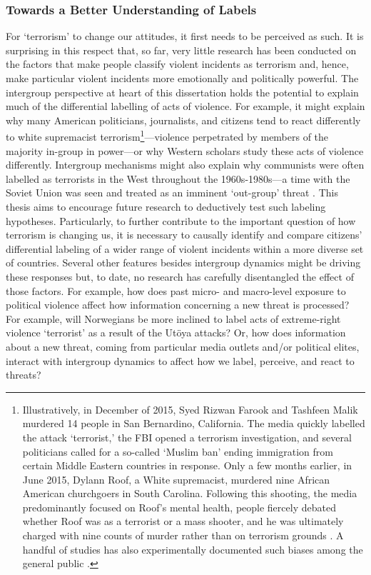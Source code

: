 \subsubsection{Towards a Better Understanding of Labels}
For `terrorism' to change our attitudes, it first needs to be perceived as such. It is surprising in this respect that, so far, very little research has been conducted on the factors that make people classify violent incidents as terrorism \citep[but for an important exception, see][]{Huff2018} and, hence, make particular violent incidents more emotionally and politically powerful. The intergroup perspective at heart of this dissertation holds the potential to explain much of the differential labelling of acts of violence. For example, it might explain why many American politicians, journalists, and citizens tend to react differently to white supremacist terrorism\footnote{Illustratively, in December of 2015, Syed Rizwan Farook and Tashfeen Malik murdered 14 people in San Bernardino, California. The media quickly labelled the attack ‘terrorist,’ the FBI opened a terrorism investigation, and several politicians called for a so-called ‘Muslim ban’ ending immigration from certain Middle Eastern countries in response. Only a few months earlier, in June 2015, Dylann Roof, a White supremacist, murdered nine African American churchgoers in South Carolina. Following this shooting, the media predominantly focused on Roof’s mental health, people fiercely debated whether Roof was as a terrorist or a mass shooter, and he was ultimately charged with nine counts of murder rather than on terrorism grounds \citep{Butler2015}. A handful of studies has also experimentally documented such biases among the general public \citep[e.g.,][]{Piazza2015}.}---violence perpetrated by members of the majority in-group in power---or why Western scholars study these acts of violence differently. Intergroup mechanisms might also explain why communists were often labelled as terrorists in the West throughout the 1960s-1980s---a time with the Soviet Union was seen and treated as an imminent `out-group' threat \citep{Stampnitzky2013}. This thesis aims to encourage future research to deductively test such labeling hypotheses. Particularly, to further contribute to the important question of how terrorism is changing us, it is necessary to causally identify and compare citizens’ differential labeling of a wider range of violent incidents within a more diverse set of countries. Several other features besides intergroup dynamics might be driving these responses but, to date, no research has carefully disentangled the effect of those factors. For example, how does past micro- and macro-level exposure to political violence affect how information concerning a new threat is processed? For example, will Norwegians be more inclined to label acts of extreme-right violence `terrorist' as a result of the Ut{\"{o}}ya attacks? Or, how does information about a new threat, coming from particular media outlets and/or political elites, interact with intergroup dynamics to affect how we label, perceive, and react to threats?



